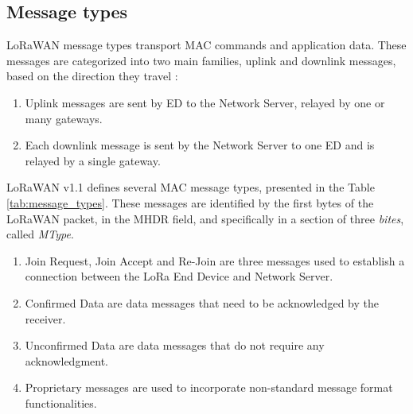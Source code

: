 \subsection{Message types}
LoRaWAN message types transport MAC commands and application data. These messages are categorized into two main families, uplink and downlink messages, based on the direction they travel \cite{the_things_network_2021}:
\begin{enumerate}
	\item Uplink messages are sent by ED to the Network Server, relayed by one or many gateways.
	\item Each downlink message is sent by the Network Server to one ED and is relayed by a single gateway.
\end{enumerate}
LoRaWAN v1.1 defines several MAC message types, presented in the Table \ref{tab:message_types}. These messages are identified by the first bytes of the LoRaWAN packet, in the MHDR field, and specifically in a section of three \textit{bites}, called \textit{MType}.

\begin{enumerate}
	\item Join Request, Join Accept and Re-Join are three messages used to establish a connection between the LoRa End Device and Network Server.
	\item Confirmed Data are data messages that need to be acknowledged by the receiver.
	\item Unconfirmed Data are data messages that do not require any acknowledgment.
	\item Proprietary messages are used to incorporate non-standard message format functionalities.
\end{enumerate}


